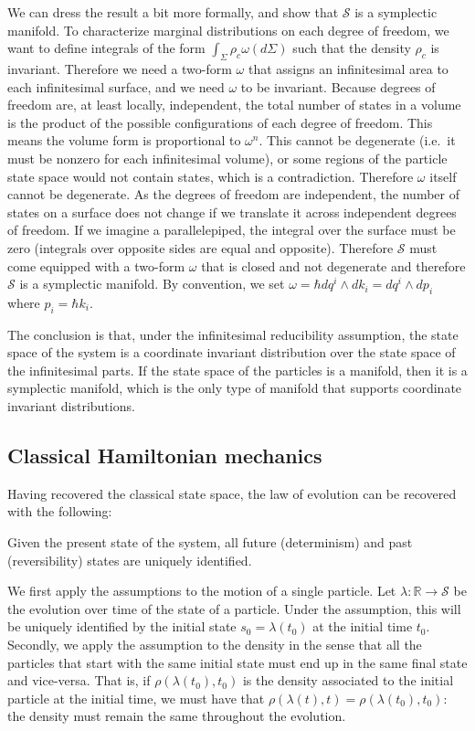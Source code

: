 \documentclass[11pt,letterpaper,fleqn]{memoir} %
\begin{document}
We can dress the result a bit more formally, and show that $\mathcal{S}$ is a symplectic manifold. To characterize marginal distributions on each degree of freedom, we want to define integrals of the form $\int_{\Sigma} \rho_c \omega(d\Sigma)$ such that the density $\rho_c$ is invariant. Therefore we need a two-form $\omega$ that assigns an infinitesimal area to each infinitesimal surface, and we need $\omega$ to be invariant. Because degrees of freedom are, at least locally, independent, the total number of states in a volume is the product of the possible configurations of each degree of freedom. This means the volume form is proportional to $\omega^n$. This cannot be degenerate (i.e.~it must be nonzero for each infinitesimal volume), or some regions of the particle state space would not contain states, which is a contradiction. Therefore $\omega$ itself cannot be degenerate. As the degrees of freedom are independent, the number of states on a surface does not change if we translate it across independent degrees of freedom. If we imagine a parallelepiped, the integral over the surface must be zero (integrals over opposite sides are equal and opposite). Therefore $\mathcal{S}$ must come equipped with a two-form $\omega$ that is closed and not degenerate and therefore $\mathcal{S}$ is a symplectic manifold. By convention, we set $\omega = \hbar dq^i \wedge dk_i = dq^i \wedge dp_i$ where $p_i = \hbar k_i$.

The conclusion is that, under the infinitesimal reducibility assumption, the state space of the system is a coordinate invariant distribution over the state space of the infinitesimal parts. If the state space of the particles is a manifold, then it is a symplectic manifold, which is the only type of manifold that supports coordinate invariant distributions.

\subsection{Classical Hamiltonian mechanics}

Having recovered the classical state space, the law of evolution can be recovered with the following:
\begin{assump}
	Given the present state of the system, all future (determinism) and past (reversibility) states are uniquely identified.
\end{assump}

We first apply the assumptions to the motion of a single particle. Let $\lambda : \mathbb{R} \to \mathcal{S}$ be the evolution over time of the state of a particle. Under the assumption, this will be uniquely identified by the initial state $s_0 = \lambda(t_0)$ at the initial time $t_0$. Secondly, we apply the assumption to the density in the sense that all the particles that start with the same initial state must end up in the same final state and vice-versa. That is, if $\rho(\lambda(t_0), t_0)$ is the density associated to the initial particle at the initial time, we must have that $\rho(\lambda(t), t) = \rho(\lambda(t_0), t_0)$: the density must remain the same throughout the evolution.
\end{document}
